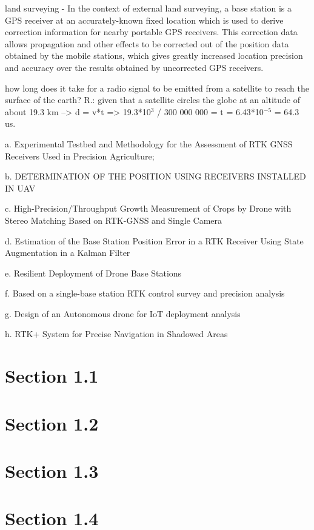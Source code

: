     land surveying - In the context of external land surveying, a base station is a GPS receiver at an accurately-known fixed location which is used to derive correction information for nearby portable GPS receivers. This correction data allows propagation and other effects to be corrected out of the position data obtained by the mobile stations, which gives greatly increased location precision and accuracy over the results obtained by uncorrected GPS receivers.

    how long does it take for a radio signal to be emitted from a satellite to reach the surface of the earth? 
    R.: given that a satellite circles the globe at an altitude of about 19.3 km --> d = v*t => 19.3*10$^3$ / 300 000 000 = t = 6.43*10$^{-5}$ = 64.3 us.

a. Experimental Testbed and Methodology for the
Assessment of RTK GNSS Receivers Used
in Precision Agriculture;

b. DETERMINATION OF THE POSITION USING
RECEIVERS INSTALLED IN UAV

c. High-Precision/Throughput Growth Measurement of
Crops by Drone with Stereo Matching Based on
RTK-GNSS and Single Camera

d. Estimation of the Base Station Position Error in a
RTK Receiver Using State Augmentation in a
Kalman Filter

e. Resilient Deployment of Drone Base Stations

f. Based on a single-base station RTK control survey
and precision analysis 

g. Design of an Autonomous drone for IoT deployment
analysis 

h. RTK+ System for Precise Navigation in Shadowed
Areas 

\section{Section 1.1}\label{sub:sub1_1}

\section{Section 1.2}\label{sec:sub1_2}

\section{Section 1.3}\label{sec:sub1_3}

\section{Section 1.4}\label{sec:sub1_4}